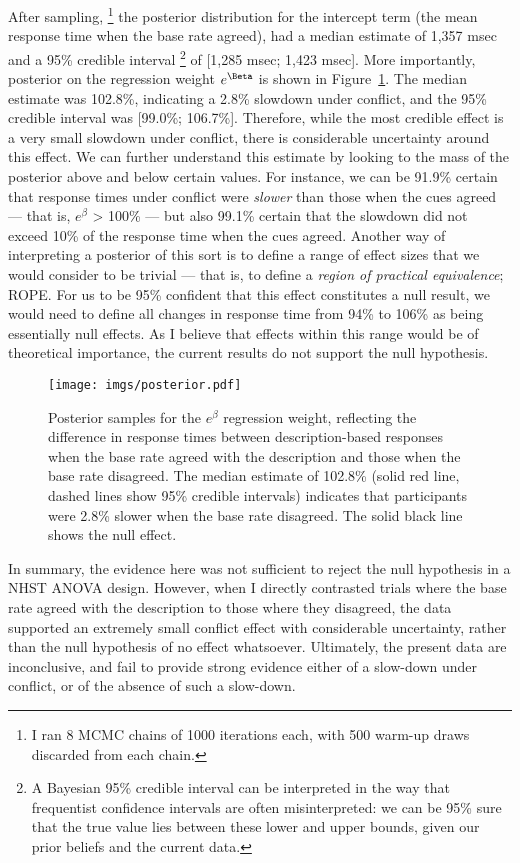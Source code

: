After sampling,%
\footnote{
  I ran 8 MCMC chains of 1000 iterations each,
  with 500 warm-up draws discarded from each chain.
  }
the posterior distribution for the intercept term
(the mean response time when the base rate agreed),
had a median estimate of 1,357 msec
and a 95\% credible interval%
\footnote{
  A Bayesian 95\% credible interval can be interpreted in the way
  that frequentist confidence intervals are often misinterpreted:
  we can be 95\% sure that the true value
  lies between these lower and upper bounds,
  given our prior beliefs and the current data.}
of [1,285 msec; 1,423 msec].
More importantly, posterior on the regression weight $e^{\Beta}$
is shown in Figure~\ref{fig:exp5_posterior}.
The median estimate was 102.8\%, indicating a 2.8\% slowdown under conflict,
and the 95\% credible interval was [99.0\%; 106.7\%].
Therefore, while the most credible effect is a very small slowdown under conflict,
there is considerable uncertainty around this effect.
We can further understand this estimate by looking to
the mass of the posterior above and below certain values.
For instance, we can be 91.9\% certain
that response times under conflict were \emph{slower} than those when the cues agreed
--- that is, $e^{\beta}$ > 100\% ---
but also 99.1\% certain that the slowdown did not exceed 10\%
of the response time when the cues agreed.
Another way of interpreting a posterior of this sort \citep{Kruschke2011}
is to define a range of effect sizes that we would consider to be trivial
--- that is, to define a \emph{region of practical equivalence}; ROPE.
For us to be 95\% confident that this effect constitutes a null result,
we would need to define all changes in response time
from 94\% to 106\% as being essentially null effects.
As I believe that effects within this range would be of theoretical importance,
the current results do not support the null hypothesis.



\begin{figure}[ht]
  \centering
  \texttt{[image: imgs/posterior.pdf]}
  \caption[Bayesian analysis of effect of the base rate
    on rt for description-based responses, Experiment 5.]{
    \label{fig:exp5_posterior}
    Posterior samples for the $e^{\beta}$ regression weight,
    reflecting the difference in response times
    between description-based responses when the base rate agreed with the description
    and those when the base rate disagreed.
    The median estimate of 102.8\%
    (solid red line, dashed lines show 95\% credible intervals)
    indicates that participants were 2.8\% slower when the base rate disagreed.
    The solid black line shows the null effect.
  }
\end{figure}

In summary, the evidence here was not sufficient
to reject the null hypothesis in a NHST ANOVA design.
However, when I directly contrasted trials where
the base rate agreed with the description
to those where they disagreed,
the data supported an extremely small conflict effect with considerable uncertainty,
rather than the null hypothesis of no effect whatsoever.
Ultimately, the present data are inconclusive,
and fail to provide strong evidence
either of a slow-down under conflict,
or of the absence of such a slow-down.
